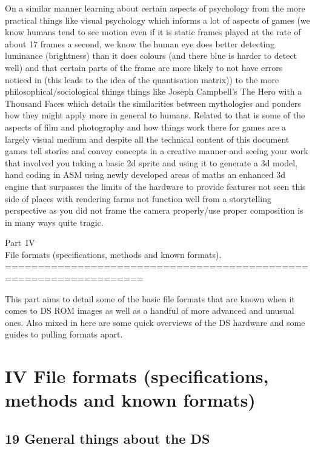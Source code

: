 \documentclass[
]{book}
\begin{document}
On a similar manner learning about certain aspects of psychology from the more practical things like visual psychology which informs a lot of aspects of games (we know humans tend to see motion even if it is static frames played at the rate of about 17 frames a second, we know the human eye does better detecting luminance (brightness) than it does colours (and there blue is harder to detect well) and that certain parts of the frame are more likely to not have errors noticed in (this leads to the idea of the quantisation matrix)) to the more philosophical/sociological things things like Joseph Campbell's The Hero with a Thousand Faces which details the similarities between mythologies and ponders how they might apply more in general to humans. Related to that is some of the aspects of film and photography and how things work there for games are a largely visual medium and despite all the technical content of this document games tell stories and convey concepts in a creative manner and seeing your work that involved you taking a basic 2d sprite and using it to generate a 3d model, hand coding in ASM using newly developed areas of maths an enhanced 3d engine that surpasses the limits of the hardware to provide features not seen this side of places with rendering farms not function well from a storytelling perspective as you did not frame the camera properly/use proper composition is in many ways quite tragic.

Part~IV\\
File formats (specifications, methods and known formats).
===================================================================

This part aims to detail some of the basic file formats that are known when it comes to DS ROM images as well as a handful of more advanced and unusual ones. Also mixed in here are some quick overviews of the DS hardware and some guides to pulling formats apart.

\hypertarget{part-iv-file-formats-specifications-methods-and-known-formats}{%
\part{IV File formats (specifications, methods and known formats)}\label{part-iv-file-formats-specifications-methods-and-known-formats}}

\hypertarget{general-things-about-the-ds}{%
\chapter{19 General things about the DS}\label{general-things-about-the-ds}}
\end{document}
